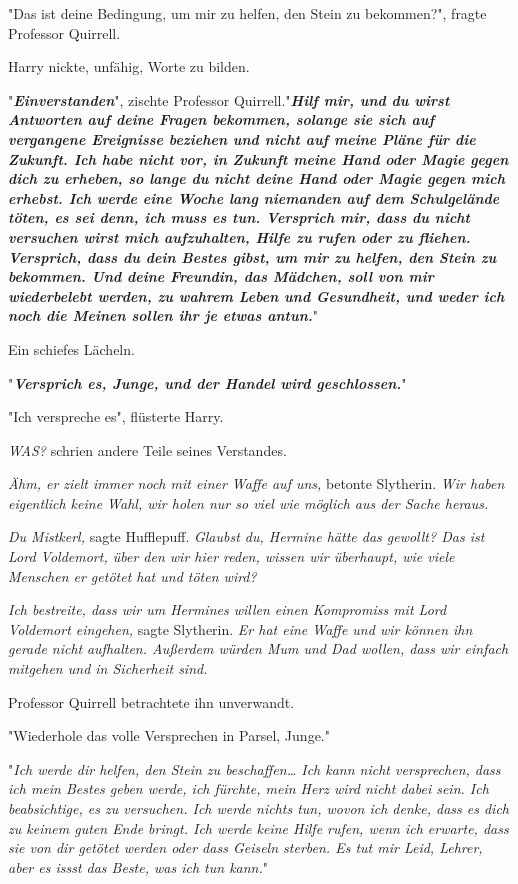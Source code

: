 {"Das ist deine Bedingung, um mir zu helfen, den Stein zu bekommen?", fragte Professor Quirrell.

Harry nickte, unfähig, Worte zu bilden.

"\textbf{\emph{Einverstanden}}", zischte Professor Quirrell."\textbf{\emph{Hilf mir, und du wirst Antworten auf deine Fragen bekommen, solange sie sich auf vergangene Ereignisse beziehen und nicht auf meine Pläne für die Zukunft. Ich habe nicht vor, in Zukunft meine Hand oder Magie gegen dich zu erheben, so lange du nicht deine Hand oder Magie gegen mich erhebst. Ich werde eine Woche lang niemanden auf dem Schulgelände töten, es sei denn, ich muss es tun. Versprich mir, dass du nicht versuchen wirst mich aufzuhalten, Hilfe zu rufen oder zu fliehen. Versprich, dass du dein Bestes gibst, um mir zu helfen, den Stein zu bekommen. Und deine Freundin, das Mädchen, soll von mir wiederbelebt werden, zu wahrem Leben und Gesundheit, und weder ich noch die Meinen sollen ihr je etwas antun.}}"

Ein schiefes Lächeln.

"\textbf{\emph{Versprich es, Junge, und der Handel wird geschlossen.}}"

"Ich verspreche es", flüsterte Harry.

\emph{WAS?} schrien andere Teile seines Verstandes.

\emph{Ähm, er zielt immer noch mit einer Waffe auf uns,} betonte Slytherin. \emph{Wir haben eigentlich keine Wahl, wir holen nur so viel wie möglich aus der Sache heraus.}

\emph{Du Mistkerl,} sagte Hufflepuff. \emph{Glaubst du, Hermine hätte das gewollt? Das ist Lord Voldemort, über den wir hier reden, wissen wir überhaupt, wie viele Menschen er getötet hat und töten wird?}

\emph{Ich bestreite, dass wir um Hermines willen einen Kompromiss mit Lord Voldemort eingehen,} sagte Slytherin. \emph{Er hat eine Waffe und wir können ihn gerade nicht} \emph{aufhalten. Außerdem würden Mum und Dad wollen, dass wir einfach mitgehen und in Sicherheit sind.}

Professor Quirrell betrachtete ihn unverwandt.

"Wiederhole das volle Versprechen in Parsel, Junge."

"\emph{Ich werde dir helfen, den Stein zu beschaffen… Ich kann nicht versprechen, dass ich mein Bestes geben werde, ich fürchte, mein Herz wird nicht dabei sein. Ich beabsichtige, es zu versuchen. Ich werde nichts tun, wovon ich denke, dass es dich zu keinem guten Ende bringt. Ich werde keine Hilfe rufen, wenn ich erwarte, dass sie von dir getötet werden oder dass Geiseln sterben. Es tut mir Leid, Lehrer, aber es issst das Beste, was ich tun kann.}"

}

